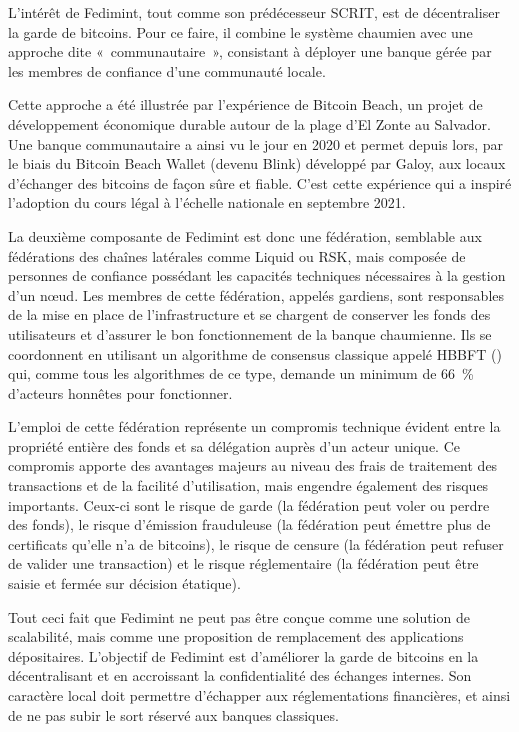 
L'intérêt de Fedimint, tout comme son prédécesseur SCRIT, est de décentraliser la garde de bitcoins. Pour ce faire, il combine le système chaumien avec une approche dite «~communautaire~», consistant à déployer une banque gérée par les membres de confiance d'une communauté locale.

Cette approche a été illustrée par l'expérience de Bitcoin Beach, un projet de développement économique durable autour de la plage d'El Zonte au Salvador. Une banque communautaire a ainsi vu le jour en 2020 et permet depuis lors, par le biais du Bitcoin Beach Wallet (devenu Blink) développé par Galoy, aux locaux d'échanger des bitcoins de façon sûre et fiable. C'est cette expérience qui a inspiré l'adoption du cours légal à l'échelle nationale en septembre 2021.

La deuxième composante de Fedimint est donc une fédération, semblable aux fédérations des chaînes latérales comme Liquid ou RSK, mais composée de personnes de confiance possédant les capacités techniques nécessaires à la gestion d'un nœud. Les membres de cette fédération, appelés gardiens, sont responsables de la mise en place de l'infrastructure et se chargent de conserver les fonds des utilisateurs et d'assurer le bon fonctionnement de la banque chaumienne. Ils se coordonnent en utilisant un algorithme de consensus classique appelé HBBFT () qui, comme tous les algorithmes de ce type, demande un minimum de 66~\% d'acteurs honnêtes pour fonctionner. %

L'emploi de cette fédération représente un compromis technique évident entre la propriété entière des fonds et sa délégation auprès d'un acteur unique. Ce compromis apporte des avantages majeurs au niveau des frais de traitement des transactions et de la facilité d'utilisation, mais engendre également des risques importants. Ceux-ci sont le risque de garde (la fédération peut voler ou perdre des fonds), le risque d'émission frauduleuse (la fédération peut émettre plus de certificats qu'elle n'a de bitcoins), le risque de censure (la fédération peut refuser de valider une transaction) et le risque réglementaire (la fédération peut être saisie et fermée sur décision étatique).

Tout ceci fait que Fedimint ne peut pas être conçue comme une solution de scalabilité, mais comme une proposition de remplacement des applications dépositaires. L'objectif de Fedimint est d'améliorer la garde de bitcoins en la décentralisant et en accroissant la confidentialité des échanges internes. Son caractère local doit permettre d'échapper aux réglementations financières, et ainsi de ne pas subir le sort réservé aux banques classiques.

